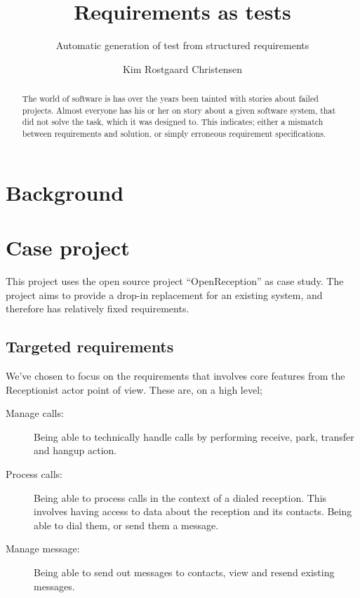\documentclass[10pt]{scrreprt}
\author{Kim Rostgaard Christensen}
\title{Requirements as tests}
\subtitle{Automatic generation of test from structured requirements}
\begin{document}
\maketitle

\begin{abstract}
The world of software is has over the years been tainted with stories about failed projects. Almost everyone has his or her on story about a given software system, that did not solve the task, which it was designed to. This indicates; either a mismatch between requirements and solution, or simply erroneous requirement specifications.
\end{abstract}

\chapter{Background}

\chapter{Case project}
This project uses the open source project ``OpenReception'' as case study. The project aims to provide a drop-in replacement for an existing system, and therefore has relatively fixed requirements.

\section{Targeted requirements}
We've chosen to focus on the requirements that involves core features from the Receptionist actor point of view. These are, on a high level;
\begin{description}
  \item[Manage calls:] Being able to technically handle calls by performing receive, park, transfer and hangup action.
  \item[Process calls:] Being able to process calls in the context of a dialed reception. This involves having access to data about the reception and its contacts. Being able to dial them, or send them a message.
  \item[Manage message:] Being able to send out messages to contacts, view and resend existing messages.
\end{description}
\end{document}
